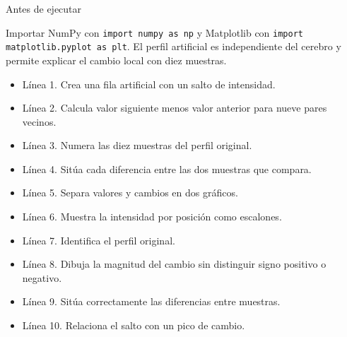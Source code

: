 
\begin{Idea}{Antes de ejecutar}

Importar NumPy con \texttt{import numpy as np} y Matplotlib con \texttt{import matplotlib.pyplot as plt}. El perfil artificial es independiente del cerebro y permite explicar el cambio local con diez muestras.


\end{Idea}



\begin{itemize}

\item Línea 1. Crea una fila artificial con un salto de intensidad.

\item Línea 2. Calcula valor siguiente menos valor anterior para nueve pares vecinos.

\item Línea 3. Numera las diez muestras del perfil original.

\item Línea 4. Sitúa cada diferencia entre las dos muestras que compara.

\item Línea 5. Separa valores y cambios en dos gráficos.

\item Línea 6. Muestra la intensidad por posición como escalones.

\item Línea 7. Identifica el perfil original.

\item Línea 8. Dibuja la magnitud del cambio sin distinguir signo positivo o negativo.

\item Línea 9. Sitúa correctamente las diferencias entre muestras.

\item Línea 10. Relaciona el salto con un pico de cambio.

\end{itemize}


